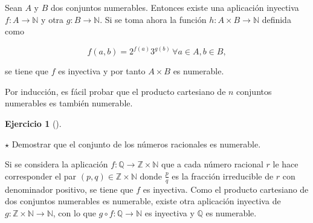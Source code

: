 \documentclass[
  spanish,
  a4paper,
]{scrreport}
\theoremstyle{definition}
\newtheorem{exercise}{Ejercicio}[chapter]
\theoremstyle{remark}
\begin{document}
\begin{tcolorbox}[enhanced jigsaw, arc=.35mm, bottomrule=.15mm, bottomtitle=1mm, breakable, colback=white, colbacktitle=quarto-callout-tip-color!10!white, colframe=quarto-callout-tip-color-frame, coltitle=black, left=2mm, leftrule=.75mm, opacityback=0, opacitybacktitle=0.6, rightrule=.15mm, title=\textcolor{quarto-callout-tip-color}{\faLightbulb}\hspace{0.5em}{Solución}, titlerule=0mm, toprule=.15mm, toptitle=1mm]

Sean \(A\) y \(B\) dos conjuntos numerables. Entonces existe una
aplicación inyectiva \(f:A\to\mathbb{N}\) y otra \(g:B\to\mathbb{N}\).
Si se toma ahora la función \(h:A\times B\to \mathbb{N}\) definida como

\[ f(a,b) = 2^{f(a)}3^{g(b)}\, \forall a\in A, b\in B,\]

se tiene que \(f\) es inyectiva y por tanto \(A\times B\) es numerable.

Por inducción, es fácil probar que el producto cartesiano de \(n\)
conjuntos numerables es también numerable.

\end{tcolorbox}

\begin{exercise}[]\protect\hypertarget{exr-racionales-numerables}{}\label{exr-racionales-numerables}

\(\star\) Demostrar que el conjunto de los números racionales es
numerable.

\end{exercise}

\begin{tcolorbox}[enhanced jigsaw, arc=.35mm, bottomrule=.15mm, bottomtitle=1mm, breakable, colback=white, colbacktitle=quarto-callout-tip-color!10!white, colframe=quarto-callout-tip-color-frame, coltitle=black, left=2mm, leftrule=.75mm, opacityback=0, opacitybacktitle=0.6, rightrule=.15mm, title=\textcolor{quarto-callout-tip-color}{\faLightbulb}\hspace{0.5em}{Solución}, titlerule=0mm, toprule=.15mm, toptitle=1mm]

Si se considera la aplicación
\(f:\mathbb{Q}\to \mathbb{Z}\times \mathbb{N}\) que a cada número
racional \(r\) le hace corresponder el par
\((p,q)\in \mathbb{Z}\times \mathbb{N}\) donde \(\frac{p}{q}\) es la
fracción irreducible de \(r\) con denominador positivo, se tiene que
\(f\) es inyectiva. Como el producto cartesiano de dos conjuntos
numerables es numerable, existe otra aplicación inyectiva de
\(g:\mathbb{Z}\times \mathbb{N}\to \mathbb{N}\), con lo que
\(g\circ f:\mathbb{Q}\to\mathbb{N}\) es inyectiva y \(\mathbb{Q}\) es
numerable.

\end{tcolorbox}
\end{document}
